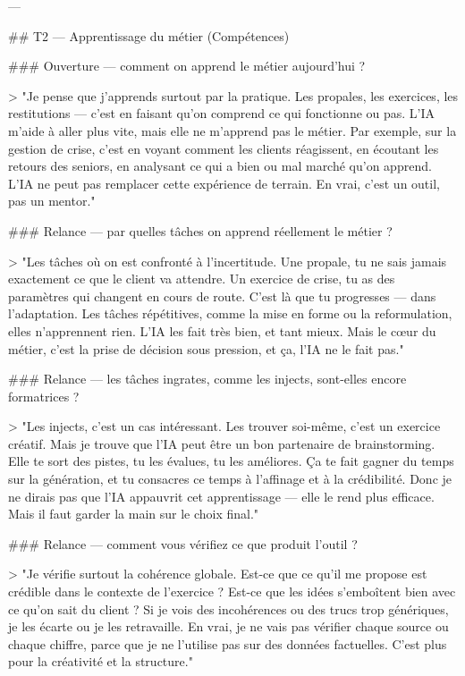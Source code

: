 ---

## T2 — Apprentissage du métier (Compétences)

### Ouverture — comment on apprend le métier aujourd'hui ?

> "Je pense que j'apprends surtout par la pratique. Les propales, les exercices, les restitutions — c'est en faisant qu'on comprend ce qui fonctionne ou pas. L'IA m'aide à aller plus vite, mais elle ne m'apprend pas le métier. Par exemple, sur la gestion de crise, c'est en voyant comment les clients réagissent, en écoutant les retours des seniors, en analysant ce qui a bien ou mal marché qu'on apprend. L'IA ne peut pas remplacer cette expérience de terrain. En vrai, c'est un outil, pas un mentor."

### Relance — par quelles tâches on apprend réellement le métier ?

> "Les tâches où on est confronté à l'incertitude. Une propale, tu ne sais jamais exactement ce que le client va attendre. Un exercice de crise, tu as des paramètres qui changent en cours de route. C'est là que tu progresses — dans l'adaptation. Les tâches répétitives, comme la mise en forme ou la reformulation, elles n'apprennent rien. L'IA les fait très bien, et tant mieux. Mais le cœur du métier, c'est la prise de décision sous pression, et ça, l'IA ne le fait pas."

### Relance — les tâches ingrates, comme les injects, sont-elles encore formatrices ?

> "Les injects, c'est un cas intéressant. Les trouver soi-même, c'est un exercice créatif. Mais je trouve que l'IA peut être un bon partenaire de brainstorming. Elle te sort des pistes, tu les évalues, tu les améliores. Ça te fait gagner du temps sur la génération, et tu consacres ce temps à l'affinage et à la crédibilité. Donc je ne dirais pas que l'IA appauvrit cet apprentissage — elle le rend plus efficace. Mais il faut garder la main sur le choix final."

### Relance — comment vous vérifiez ce que produit l'outil ?

> "Je vérifie surtout la cohérence globale. Est-ce que ce qu'il me propose est crédible dans le contexte de l'exercice ? Est-ce que les idées s'emboîtent bien avec ce qu'on sait du client ? Si je vois des incohérences ou des trucs trop génériques, je les écarte ou je les retravaille. En vrai, je ne vais pas vérifier chaque source ou chaque chiffre, parce que je ne l'utilise pas sur des données factuelles. C'est plus pour la créativité et la structure."

